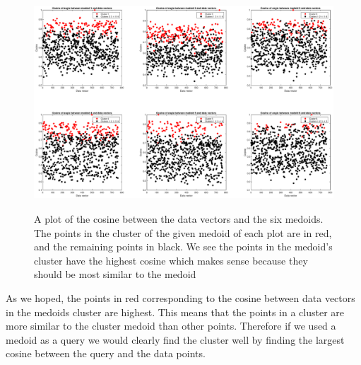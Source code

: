 \documentclass{article}
\begin{document}
\begin{figure}[H]
    \centerline
    {
    \includegraphics[width=17.5cm, height=8cm]{f_cosine}
    }
    \caption{\label{fig:my figure} A plot of the cosine between the data vectors and the six medoids.  The points in the cluster of the given medoid of each plot are in red, and the remaining points in black.  We see the points in the medoid's cluster have the highest cosine which makes sense because they should be most similar to the medoid}
\end{figure}

As we hoped, the points in red corresponding to the cosine between data vectors in the medoids cluster are highest.  This means that the points in a cluster are more similar to the cluster medoid than other points. Therefore if we used a medoid as a query we would clearly find the cluster well by finding the largest cosine between the query and the data points.
\end{document}
